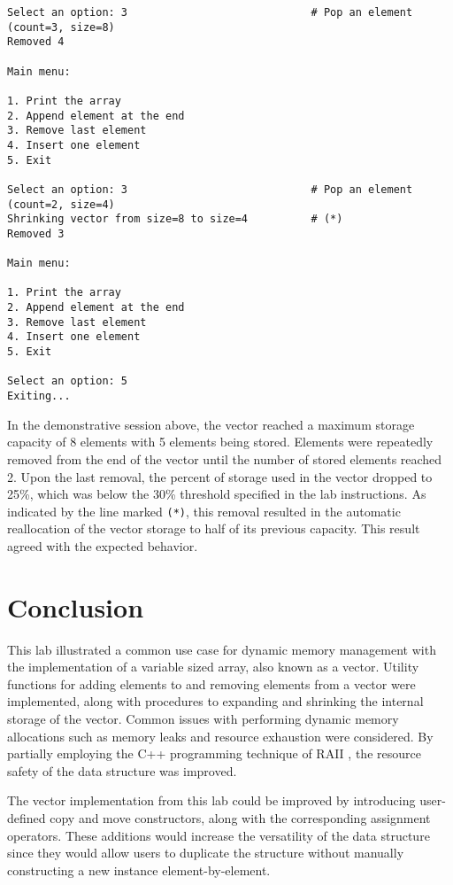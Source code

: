 \documentclass[11pt, letterpaper]{article} %
\begin{document}
\begin{lstlisting}[style=labreportstyle-sh]
Select an option: 3                             # Pop an element (count=3, size=8)
Removed 4

Main menu:

1. Print the array
2. Append element at the end
3. Remove last element
4. Insert one element
5. Exit

Select an option: 3                             # Pop an element (count=2, size=4)
Shrinking vector from size=8 to size=4          # (*)
Removed 3

Main menu:

1. Print the array
2. Append element at the end
3. Remove last element
4. Insert one element
5. Exit

Select an option: 5
Exiting...
\end{lstlisting}

In the demonstrative session above, the vector reached a maximum storage capacity of 8 elements with 5 elements being stored. Elements were repeatedly removed from the end of the vector until the number of stored elements reached 2. Upon the last removal, the percent of storage used in the vector dropped to 25\%, which was below the 30\% threshold specified in the lab instructions. As indicated by the line marked \texttt{(*)}, this removal resulted in the automatic reallocation of the vector storage to half of its previous capacity. This result agreed with the expected behavior.


\section*{Conclusion}

This lab illustrated a common use case for dynamic memory management with the implementation of a variable sized array, also known as a vector. Utility functions for adding elements to and removing elements from a vector were implemented, along with procedures to expanding and shrinking the internal storage of the vector. Common issues with performing dynamic memory allocations such as memory leaks and resource exhaustion were considered. By partially employing the C++ programming technique of RAII \cite{cppreference-raii}, the resource safety of the data structure was improved.

The vector implementation from this lab could be improved by introducing user-defined copy and move constructors, along with the corresponding assignment operators. These additions would increase the versatility of the data structure since they would allow users to duplicate the structure without manually constructing a new instance element-by-element.
\end{document}
